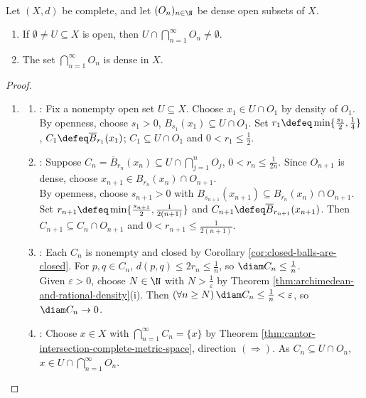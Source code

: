 \begin{theorem} \label{thm:dense-open-baire-complete-metric-space} \\
Let $(X,d)$ be complete, and let $(O_n)_{n\in\N}$ be dense open subsets of $X$.
\begin{enumerate}[label=(\roman*)]
\setlength{\itemsep}{0pt}
\item If $\emptyset\ne U\subseteq X$ is open, then $U\cap\bigcap\limits_{n=1}^{\infty}O_n\ne\emptyset$.
\item The set $\bigcap\limits_{n=1}^{\infty}O_n$ is dense in $X$.
\end{enumerate}
\begin{proof}
\begin{enumerate}[label=(\roman*)]
\setlength{\itemsep}{0pt}
\item
\begin{enumerate}[label=(\alph*)]
\setlength{\itemsep}{0pt}
\item {}: Fix a nonempty open set $U\subseteq X$. Choose $x_1\in U\cap O_1$ by density of $O_1$.\\
By openness, choose $s_1>0$, $B_{s_1}(x_1)\subseteq U\cap O_1$. Set $r_1\defeq\min\{\frac{s_1}{2},\frac{1}{4}\}$, $C_1\defeq\overline{B}_{r_1}(x_1)$; $C_1\subseteq U\cap O_1$ and $0<r_1\leq\frac{1}{2}$.
\item {}: Suppose $C_n=\overline{B}_{r_n}(x_n)\subseteq U\cap\bigcap\limits_{j=1}^{n}O_j$, $0<r_n\leq\frac{1}{2n}$. Since $O_{n+1}$ is dense, choose $x_{n+1}\in B_{r_n}(x_n)\cap O_{n+1}$.\\
By openness, choose $s_{n+1}>0$ with $B_{s_{n+1}}(x_{n+1})\subseteq B_{r_n}(x_n)\cap O_{n+1}$.\\
Set $r_{n+1}\defeq\min\{\frac{s_{n+1}}{2},\frac{1}{2(n+1)}\}$ and $C_{n+1}\defeq\overline{B}_{r_{n+1}}(x_{n+1})$. Then $C_{n+1}\subseteq C_n\cap O_{n+1}$ and $0<r_{n+1}\leq\frac{1}{2(n+1)}$.
\item {}: Each $C_n$ is nonempty and closed by Corollary \ref{cor:closed-balls-are-closed}. For $p,q\in C_n$, $d(p,q)\leq2r_n\leq\frac{1}{n}$, so $\diam C_n\leq\frac{1}{n}$.\\
Given $\varepsilon>0$, choose $N\in\N$ with $N>\frac{1}{\varepsilon}$ by Theorem \ref{thm:archimedean-and-rational-density}(i). Then $(\forall n\geq N)\,\diam C_n\leq\frac{1}{n}<\varepsilon$, so $\diam C_n\to0$.
\item {}: Choose $x\in X$ with $\bigcap\limits_{n=1}^{\infty}C_n=\{x\}$ by Theorem \ref{thm:cantor-intersection-complete-metric-space}, direction $(\Rightarrow)$. As $C_n\subseteq U\cap O_n$, $x\in U\cap\bigcap\limits_{n=1}^{\infty}O_n$.

\end{enumerate}
\end{enumerate}
\end{proof}
\end{theorem}
